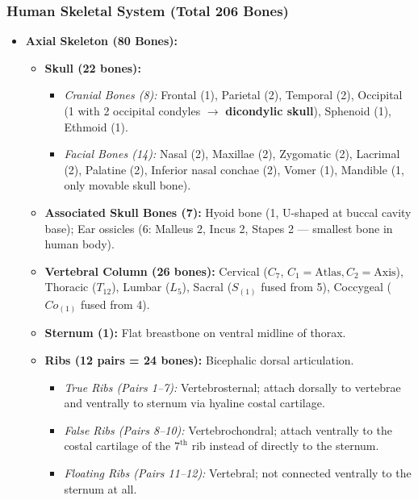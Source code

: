 \documentclass[11pt,a4paper]{article}
\begin{document}
\subsubsection{Human Skeletal System (Total 206 Bones)}
\begin{itemize}[leftmargin=1.5em, itemsep=2pt]
  \item \textbf{Axial Skeleton (80 Bones):}
  \begin{itemize}[label=$\circ$]
    \item \textbf{Skull (22 bones):}
    \begin{itemize}
      \item \textit{Cranial Bones (8):} Frontal (1), Parietal (2), Temporal (2), Occipital (1 with 2 occipital condyles $\to$ \textbf{dicondylic skull}), Sphenoid (1), Ethmoid (1).
      \item \textit{Facial Bones (14):} Nasal (2), Maxillae (2), Zygomatic (2), Lacrimal (2), Palatine (2), Inferior nasal conchae (2), Vomer (1), Mandible (1, only movable skull bone).
    \end{itemize}
    \item \textbf{Associated Skull Bones (7):} Hyoid bone (1, U-shaped at buccal cavity base); Ear ossicles (6: Malleus 2, Incus 2, Stapes 2 --- smallest bone in human body).
    \item \textbf{Vertebral Column (26 bones):} Cervical ($C_7$, $C_1=\text{Atlas}, C_2=\text{Axis}$), Thoracic ($T_{12}$), Lumbar ($L_5$), Sacral ($S_{(1)}$ fused from 5), Coccygeal ($Co_{(1)}$ fused from 4).
    \item \textbf{Sternum (1):} Flat breastbone on ventral midline of thorax.
    \item \textbf{Ribs (12 pairs = 24 bones):} Bicephalic dorsal articulation.
    \begin{itemize}
      \item \textit{True Ribs (Pairs 1--7):} Vertebrosternal; attach dorsally to vertebrae and ventrally to sternum via hyaline costal cartilage.
      \item \textit{False Ribs (Pairs 8--10):} Vertebrochondral; attach ventrally to the costal cartilage of the $7^{\text{th}}$ rib instead of directly to the sternum.
      \item \textit{Floating Ribs (Pairs 11--12):} Vertebral; not connected ventrally to the sternum at all.
    \end{itemize}
  \end{itemize}


\end{itemize}
\end{document}
